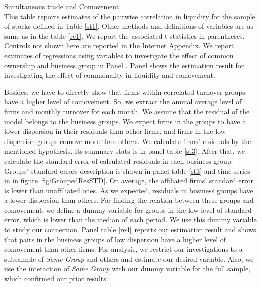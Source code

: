 	\begin{table}[htbp]
		\centering
		\caption{Simultaneous trade and Comovement\\ \small
			This table reports \cite{FamaMacBeth} estimates of the pairwise correlation in liquidity for the sample of stocks defined in Table \ref{st1}. Other methods and definitions of variables are as same as in the table \ref{re1}. We report the associated t-statistics in parentheses. Controls not shown here are reported in the Internet Appendix. We report estimates of regressions using variables to investigate the effect of common ownership and business group in Panel . Panel  shows the estimation result for investigating the effect of commonality in liquidity and comovement. }
		\label{re3}
		\label{mresult2-turnover}
		
		\resizebox{\textwidth}{!}{
			\centering
			
		}
		\bigskip
		\label{turncomovement}
		\resizebox{\textwidth}{!}{
			\centering
			
		}
	
	\end{table}
\restoregeometry


Besides, we have to directly show that firms within correlated turnover groups have a higher level of comovement. So, we extract the annual average level of firms and monthly turnover for each month. We assume that the residual of the model belongs to the business groups. We expect firms in the groups to have a lower dispersion in their residuals than other firms, and firms in the low dispersion groups comove more than others. We calculate firms' residuals by the mentioned hypothesis. Its summary stats is in panel  table \ref{st3}. After that, we calculate the standard error of calculated residuals in each business group. Groups' standard errors description is shown in  panel  table \ref{st3} and time series in in figure \ref{fig:GroupedResSTD}. On average, the affiliated firms' standard error is lower than unaffiliated ones. As we expected, residuals in business groups have a lower dispersion than others. For finding the relation between these groups and comovement, we define a dummy variable for groups in the low level of standard error, which is lower than the median of each period. We use this dummy variable to study our connection. Panel  table \ref{re4} reports our estimation result and shows that pairs in the business groups of low dispersion have a higher level of comovement than other firms. For analysis, we restrict our investigations to a subsample of \textit{Same Group} and others and estimate our desired variable.   Also, we use the interaction of \textit{Same Group} with our dummy variable for the full sample, which confirmed our prior results. 


